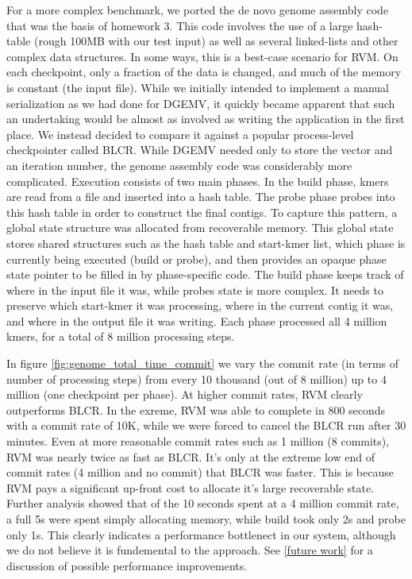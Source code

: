 For a more complex benchmark, we ported the de novo genome assembly code that
was the basis of homework 3. This code involves the use of a large hash-table
(rough 100MB with our test input) as well as several linked-lists and other
complex data structures. In some ways, this is a best-case scenario for RVM. On
each checkpoint, only a fraction of the data is changed, and much of the memory
is constant (the input file). While we initially intended to implement a manual
serialization as we had done for DGEMV, it quickly became apparent that such an
undertaking would be almost as involved as writing the application in the first
place. We instead decided to compare it against a popular process-level
checkpointer called BLCR\cite{BLCR}. While DGEMV needed only to store the vector
and an iteration number, the genome assembly code was considerably more
complicated. Execution consists of two main phases. In the build phase, kmers
are read from a file and inserted into a hash table. The probe phase probes into
this hash table in order to construct the final contigs. To capture this
pattern, a global state structure was allocated from recoverable memory. This
global state stores shared structures such as the hash table and start-kmer
list, which phase is currently being executed (build or probe), and then
provides an opaque phase state pointer to be filled in by phase-specific code.
 The build phase keeps track of where in the input file it was, while probes
state is more complex. It needs to preserve which start-kmer it was
processing, where in the current contig it was, and where in the output file it
was writing. Each phase processed all 4 million kmers, for a total of 8 million
processing steps.

In figure \ref{fig:genome_total_time_commit} we vary the commit rate (in terms of number of
processing steps) from every 10 thousand (out of 8 million) up to 4 million
(one checkpoint per phase). At higher commit rates, RVM clearly outperforms
BLCR. In the exreme, RVM was able to complete in 800 seconds with a commit rate
of 10K, while we were forced to cancel the BLCR run after 30 minutes. Even at
more reasonable commit rates such as 1 million (8 commits), RVM was nearly twice
as fast as BLCR. It's only at the extreme low end of commit rates (4 million
and no commit) that BLCR was faster. This is because RVM pays a significant
up-front cost to allocate it's large recoverable state. Further analysis showed
that of the 10 seconds spent at a 4 million commit rate, a full 5s were spent
simply allocating memory, while build took only 2s and probe only 1s. This
clearly indicates a performance bottlenect in our system, although we do not
believe it is fundemental to the approach. See \ref{future work} for a
discussion of possible performance improvements. 

